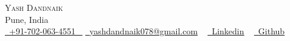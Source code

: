 \documentclass[letterpaper,11pt]{article}
\makeatletter
\newcommand{\resumeSubheading}[4]{
  \vspace{-2pt}\item
    \begin{tabular*}{1.0\textwidth}[t]{l@{\extracolsep{\fill}}r}
      \textbf{\large#1} & \textbf{\small #2} \\
      \textit{\large#3} & \textit{\small #4} \\
      
    \end{tabular*}\vspace{-7pt}
}
\newcommand{\resumeSubHeadingListStart}{\begin{itemize}[leftmargin=0.0in, label={}]}
\newcommand{\resumeSubHeadingListEnd}{\end{itemize}}
\makeatother
\begin{document}


\begin{center}
    {\Huge \scshape                                    Yash Dandnaik} \\ \vspace{1pt}
    Pune, India \\ \vspace{1pt}
    \small \href{tel:#}{ \raisebox{-0.1\height}\faPhone\ \underline{+91-702-063-4551} ~} \href{mailto:yashdandnaik078@gmail.com}{\raisebox{-0.2\height}\faEnvelope\  \underline{yashdandnaik078@gmail.com}} ~ 
    \href{https://linkedin.com/in/yash-dandnaik}{\raisebox{-0.2\height}\faLinkedinSquare\ \underline{Linkedin}}  ~
    \href{https://github.com/yash-ad}{\raisebox{-0.2\height}\faGithub\ \underline{Github}} ~
\end{center}
 \vspace{0.5mm}


  

\end{document}
